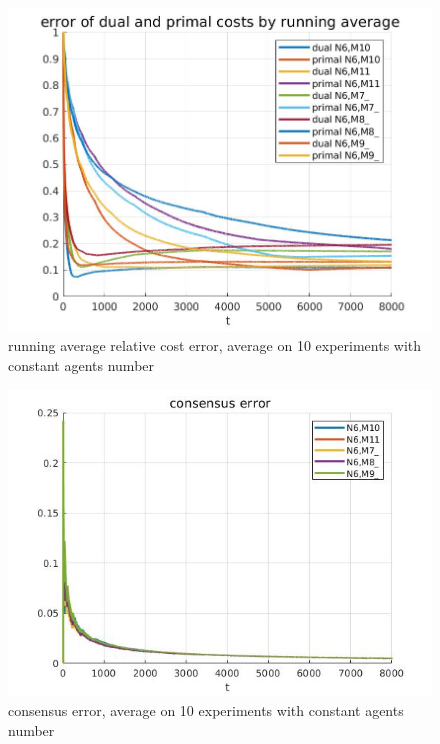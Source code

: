 \documentclass{article}
\begin{document}
\begin{figure}[h!]
    \centering
    \includegraphics[scale=0.41]{images/aggr_REP10_CostPlot_N6_[M9]_.jpg}
    \caption{running average relative cost error, average on 10 experiments with constant agents number}
    \label{fig:running average cost error plot}
\end{figure}
\begin{figure}[h!]
    \centering
    \includegraphics[scale=0.45]{images/aggr_REP10_ConsPlot_N6_[M9]_.jpg}
    \caption{consensus error, average on 10 experiments with constant agents number}
    \label{fig:running average cost error plot}
\end{figure}
\newpage
\end{document}
